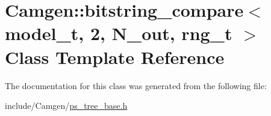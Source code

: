 \hypertarget{a00026}{}\section{Camgen\+:\+:bitstring\+\_\+compare$<$ model\+\_\+t, 2, N\+\_\+out, rng\+\_\+t $>$ Class Template Reference}
\label{a00026}


The documentation for this class was generated from the following file\+:\begin{DoxyCompactItemize}
\item 
include/\+Camgen/\hyperlink{a00745}{ps\+\_\+tree\+\_\+base.\+h}\end{DoxyCompactItemize}
